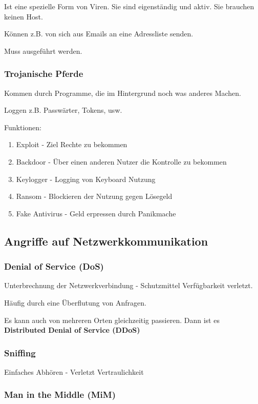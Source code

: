 \documentclass[a4paper]{article}
\begin{document}
Ist eine spezielle Form von Viren. Sie sind eigenständig und aktiv. Sie brauchen keinen Host.

Können z.B. von sich aus Emails an eine Adressliste senden.

Muss ausgeführt werden.

\subsubsection{Trojanische Pferde}

Kommen durch Programme, die im Hintergrund noch was anderes Machen.

Loggen z.B. Passwärter, Tokens, usw.

Funktionen:

\begin{enumerate}
    \item Exploit - Ziel Rechte zu bekommen
    \item Backdoor - Über einen anderen Nutzer die Kontrolle zu bekommen
    \item Keylogger - Logging von Keyboard Nutzung
    \item Ransom - Blockieren der Nutzung gegen Lösegeld
    \item Fake Antivirus - Geld erpressen durch Panikmache
\end{enumerate}

\subsection{Angriffe auf Netzwerkkommunikation}

\subsubsection{Denial of Service (DoS)}

Unterbrechnung der Netzwerkverbindung - Schutzmittel Verfügbarkeit verletzt.

Häufig durch eine Überflutung von Anfragen.

Es kann auch von mehreren Orten gleichzeitig passieren. Dann ist es \textbf{Distributed Denial of Service (DDoS)}

\subsubsection{Sniffing}

Einfaches Abhören - Verletzt Vertraulichkeit

\subsubsection{Man in the Middle (MiM)}
\end{document}
